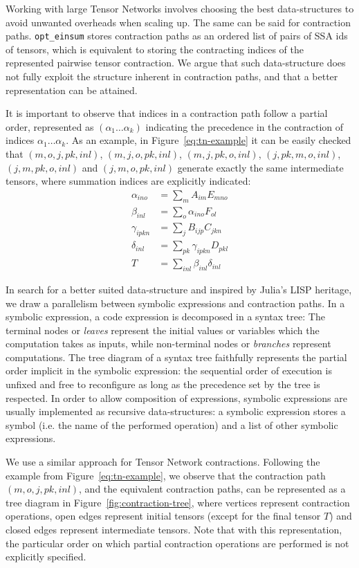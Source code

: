 \documentclass{juliacon}
\begin{document}
Working with large Tensor Networks involves choosing the best data-structures to avoid unwanted overheads when scaling up. The same can be said for contraction paths. \texttt{opt\_einsum} stores contraction paths as an ordered list of pairs of SSA ids of tensors, which is equivalent to storing the contracting indices of the represented pairwise tensor contraction. We argue that such data-structure does not fully exploit the structure inherent in contraction paths, and that a better representation can be attained.

It is important to observe that indices in a contraction path follow a partial order, represented as $(\alpha_1 \ldots \alpha_k)$ indicating the precedence in the contraction of indices $\alpha_1 \ldots \alpha_k$. As an example, in Figure~\ref{eq:tn-example} it can be easily checked that $(m,o,j,pk,inl)$, $(m,j,o,pk,inl)$, $(m,j,pk,o,inl)$, $(j,pk,m,o,inl)$, $(j,m,pk,o,inl)$ and $(j,m,o,pk,inl)$ generate exactly the same intermediate tensors, where summation indices are explicitly indicated:
\begin{align*}
\label{eq:contraction-path}
    \alpha_{ino} &= \sum_{m} A_{im} E_{mno} \\
    \beta_{inl} &= \sum_{o} \alpha_{ino} F_{ol}\\
    \gamma_{ipkn} &= \sum_{j} B_{ijp} C_{jkn} \\
    \delta_{inl} &= \sum_{pk} \gamma_{ipkn} D_{pkl}\\
    T &= \sum_{inl} \beta_{inl} \delta_{inl} 
\end{align*} 

In search for a better suited data-structure and inspired by Julia's LISP heritage, we draw a parallelism between symbolic expressions and contraction paths.
In a symbolic expression, a code expression is decomposed in a syntax tree: The terminal nodes or \textit{leaves} represent the initial values or variables which the computation takes as inputs, while non-terminal nodes or \textit{branches} represent computations. The tree diagram of a syntax tree faithfully represents the partial order implicit in the symbolic expression: the sequential order of execution is unfixed and free to reconfigure as long as the precedence set by the tree is respected. In order to allow composition of expressions, symbolic expressions are usually implemented as recursive data-structures: a symbolic expression stores a symbol (i.e. the name of the performed operation) and a list of other symbolic expressions.

We use a similar approach for Tensor Network contractions. Following the example from Figure~\ref{eq:tn-example}, we observe that the contraction path $(m,o,j,pk,inl)$, and the equivalent contraction paths, can be represented as a tree diagram in Figure~\ref{fig:contraction-tree}, where vertices represent contraction operations, open edges represent initial tensors (except for the final tensor $T$) and closed edges represent intermediate tensors. Note that with this representation, the particular order on which partial contraction operations are performed is not explicitly specified.
\end{document}
